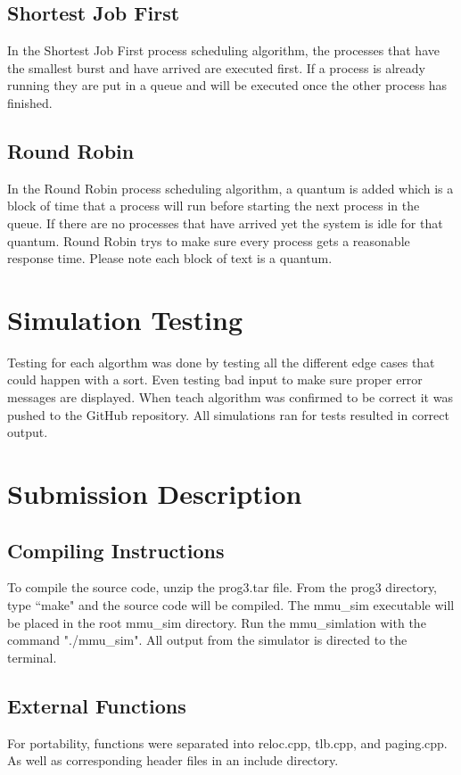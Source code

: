 \begin{multicols}{2}
\subsection{Shortest Job First}
In the Shortest Job First process scheduling algorithm, the processes that have the smallest burst and have arrived are executed first. If a process is already running they are put in a queue and will be executed once the other process has finished.

\subsection{Round Robin}
In the Round Robin process scheduling algorithm, a quantum is added which is a block of time that a process will run before starting the next process in the queue. If there are no processes that have arrived yet the system is idle for that quantum. Round Robin trys to make sure every process gets a reasonable response time. Please note each block of text is a quantum.

\section{Simulation Testing}
Testing for each algorthm was done by testing all the different edge cases that could happen with a sort. Even testing bad input to make sure proper error messages are displayed. When teach algorithm was confirmed to be correct it was pushed to the GitHub repository. All simulations ran for tests resulted in correct output.

\section{Submission Description}\label{submission_description}
\subsection{Compiling Instructions}
To compile the source code, unzip the prog3.tar file. From the prog3 directory, type ``make" and the source code will be compiled. The mmu\_sim executable will be placed in the root mmu\_sim directory. Run the mmu\_simlation with the command "./mmu\_sim". All output from the simulator is directed to the terminal.

\subsection{External Functions}
For portability, functions were separated into reloc.cpp, tlb.cpp, and paging.cpp. As well as corresponding header files in an include directory.


\end{multicols}

